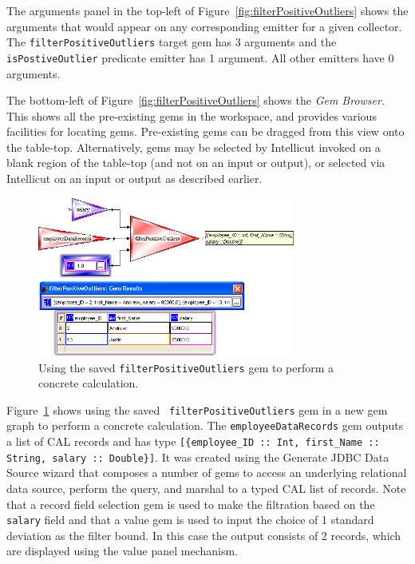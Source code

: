\documentclass[preprint]{sigplanconf}
\begin{document}
The arguments panel in the top-left of
Figure~\ref{fig:filterPositiveOutliers} shows the arguments that would
appear on any corresponding emitter for a given collector. 
The {\tt filterPositiveOutliers} target gem has 3 arguments and the
{\tt isPostiveOutlier} predicate emitter has 1 argument.
All other emitters have 0 arguments.

The bottom-left of Figure~\ref{fig:filterPositiveOutliers} shows the
{\it Gem Browser}. This shows all the pre-existing gems in the
workspace, and provides various facilities for locating
gems. Pre-existing gems can be dragged from this view onto the
table-top. Alternatively, gems may be selected by Intellicut invoked on a blank region of the
table-top (and not on an input or output), or selected via Intellicut
on an input or output as described earlier.

\begin{figure}[hbt]
  \centering
  \includegraphics[width=20pc]{runFilterOutliers.png}
  \caption{Using the saved {\tt filterPositiveOutliers} gem to perform a concrete calculation.}
  \label{fig:runFilterOutliers}
\end{figure}

Figure~\ref{fig:runFilterOutliers} shows using the saved {\tt
filterPositiveOutliers} gem in a new gem graph to perform a concrete
calculation. The {\tt employeeDataRecords} gem outputs a list of CAL
records and has type {\tt [\{employee\_ID :: Int, first\_Name :: String,
salary :: Double\}]}. It was created using the Generate JDBC Data
Source wizard that composes a number of gems to access an
underlying relational data source, perform the query, and marshal to a
typed CAL list of records. Note that a record field selection gem is
used to make the filtration based on the {\tt salary} field and that a
value gem is used to input the choice of 1 standard deviation as the
filter bound. In this case the output consists of 2 records, which are
displayed using the value panel mechanism.
\end{document}

